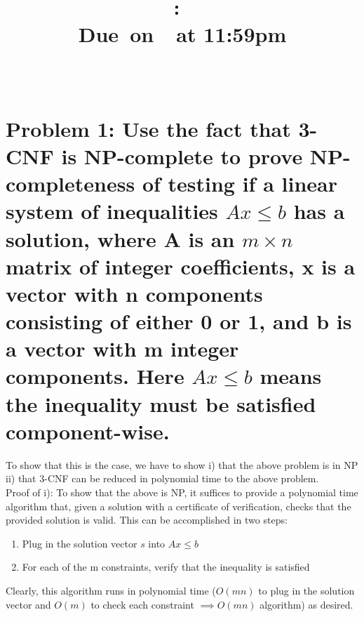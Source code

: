 \documentclass{article}
\title{
    \vspace{2in}
    \textmd{\textbf{\hmwkClass:\ \hmwkTitle}}\\
    \normalsize\vspace{0.1in}\small{Due\ on\ \hmwkDueDate\ at 11:59pm}\\
    \vspace{0.1in}\large{\textit{\hmwkClassInstructor\ \hmwkClassTime}}
    \vspace{3in}
}
\author{\hmwkAuthorName}
\date{}
\begin{document}
\maketitle

\pagebreak

\section*{Problem 1: Use the fact that 3-CNF is NP-complete to prove NP-completeness of testing if a linear system of inequalities $Ax \leq b$ has a solution, where A is an $m \times n$ matrix of integer coefficients, x is a vector with n components consisting of either 0 or 1, and b is a vector with m integer components. Here $Ax \leq b$ means the inequality must be satisfied component-wise.}
To show that this is the case, we have to show i) that the above problem is in NP ii) that 3-CNF can be reduced in polynomial time to the above problem. \\
Proof of i): To show that the above is NP, it suffices to provide a polynomial time algorithm that, given a solution with a certificate of verification, checks that the provided solution is valid. This can be accomplished in two steps: 
\begin{enumerate}
\item Plug in the solution vector $s$ into $Ax \leq b$
\item For each of the m constraints, verify that the inequality is satisfied
\end{enumerate}
Clearly, this algorithm runs in polynomial time ($O(mn)$ to plug in the solution vector and $O(m)$ to check each constraint $\implies O(mn)$ algorithm) as desired.  \\
\end{document}
